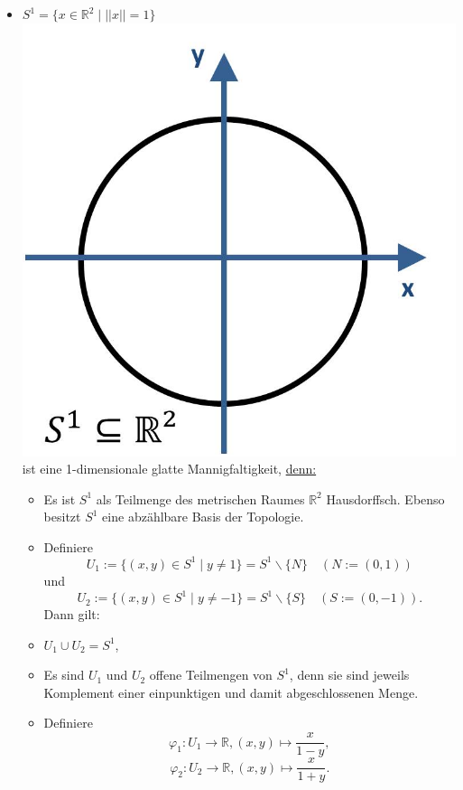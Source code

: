 \documentclass[a4paper,11pt,notitlepage]{report}
\newcommand{\R}{{\ensuremath{\mathbb{R}}}}
\begin{document}
\begin{enumerate}
\begin{itemize}
		\item $S^1 = \{ x \in \R^2 \mid ||x|| = 1\}$ \newline
		\includegraphics[scale=0.4]{images/S1.jpg} \newline
		ist eine 1-dimensionale glatte Mannigfaltigkeit, \underline{denn:}
			\begin{itemize}
				\item Es ist $S^1$ als Teilmenge des metrischen Raumes $\R^2$ Hausdorffsch.
					\newline
					Ebenso besitzt $S^1$ eine abzählbare Basis der Topologie.
				\item Definiere $$U_1 := \{(x,y) \in S^1 \mid y \neq 1\} = S^1 \backslash \{N\} \quad \left(N := (0,1)\right)$$ und $$U_2 := \{(x,y) \in S^1 \mid y \neq -1\} = S^1 \backslash \{S\} \quad \left(S := (0,-1)\right).$$
				Dann gilt:
				\item $U_1 \cup U_2 = S^1$,
				\item Es sind $U_1$ und $U_2$ offene Teilmengen von $S^1$, denn sie sind jeweils Komplement einer einpunktigen und damit abgeschlossenen Menge.
				\item Definiere $$\varphi_1 \colon U_1 \rightarrow \R, (x,y) \mapsto \frac{x}{1-y},$$
				$$\varphi_2 \colon U_2 \rightarrow \R, (x,y) \mapsto \frac{x}{1+y}.$$

\end{itemize}
\end{itemize}
\end{enumerate}
\end{document}
